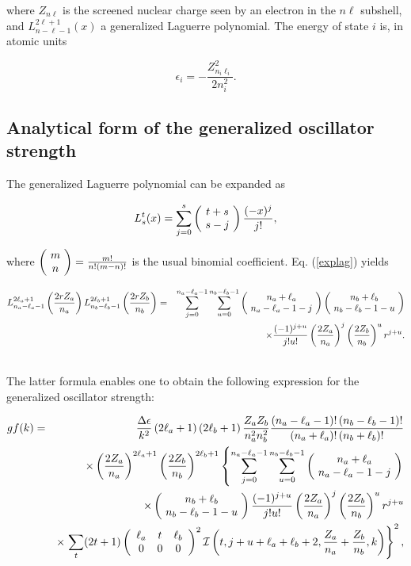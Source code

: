 \documentclass[a4paper,10pt]{article}
\begin{document}
\noindent where $Z_{n\ell}$ is the screened nuclear charge seen by an electron in the $n\ell$ subshell, and $L_{n-\ell-1}^{2\ell+1}(x)$ a generalized Laguerre polynomial. The energy of state $i$ is, in atomic units

\begin{equation*}
\epsilon_i=-\frac{Z_{n_i\ell_i}^2}{2n_i^2}.
\end{equation*}

\subsection{Analytical form of the generalized oscillator strength}\label{subsec23}

The generalized Laguerre polynomial can be expanded as 

\begin{equation}\label{explag}
L_s^t(x)=\sum_{j=0}^s\left(\begin{array}{c}\!t+s\!\\\!s-j\!\end{array}\right)\frac{(-x)^j}{j!},
\end{equation}

\noindent where $\left(\begin{array}{c}\!m\!\\\!n\!\end{array}\right)=\frac{m!}{n!(m-n)!}$ is the usual binomial coefficient. Eq. (\ref{explag}) yields

\begin{eqnarray*}
L_{n_a-\ell_a-1}^{2\ell_a+1}\left(\frac{2rZ_a}{n_a}\right)L_{n_b-\ell_b-1}^{2\ell_b+1}\left(\frac{2rZ_b}{n_b}\right)&=&\sum_{j=0}^{n_a-\ell_a-1}\sum_{u=0}^{n_b-\ell_b-1}\bin{n_a+\ell_a}{n_a-\ell_a-1-j}\bin{n_b+\ell_b}{n_b-\ell_b-1-u}\nonumber\\
& &\times\frac{(-1)^{j+u}}{j!u!}\left(\frac{2Z_a}{n_a}\right)^j\left(\frac{2Z_b}{n_b}\right)^ur^{j+u}.\nonumber\\
& &
\end{eqnarray*}

\noindent The latter formula enables one to obtain the following expression for the generalized oscillator strength:

\begin{eqnarray*}
gf(k)&=&\frac{\Delta \epsilon}{k^2}\left(2\ell_a+1\right)\left(2\ell_b+1\right)\frac{Z_aZ_b}{n_a^2n_b^2}\frac{\left(n_a-\ell_a-1\right)!\left(n_b-\ell_b-1\right)!}{\left(n_a+\ell_a\right)!\left(n_b+\ell_b\right)!}\nonumber\\
& &\times\left(\frac{2Z_a}{n_a}\right)^{2\ell_a+1}\left(\frac{2Z_b}{n_b}\right)^{2\ell_b+1}\left\{\sum_{j=0}^{n_a-\ell_a-1}\sum_{u=0}^{n_b-\ell_b-1}\bin{n_a+\ell_a}{n_a-\ell_a-1-j}\right.\nonumber\\
& &\times\bin{n_b+\ell_b}{n_b-\ell_b-1-u}\frac{(-1)^{j+u}}{j!u!}\left(\frac{2Z_a}{n_a}\right)^j\left(\frac{2Z_b}{n_b}\right)^ur^{j+u}\nonumber\\
& &\times\left. \sum_t(2t+1)\threej{\ell_a}{t}{\ell_b}{0}{0}{0}^2\mathcal{I}\left(t,j+u+\ell_a+\ell_b+2,\frac{Z_a}{n_a}+\frac{Z_b}{n_b},k\right)\right\}^2,\nonumber\\
& &
\end{eqnarray*}
\end{document}
